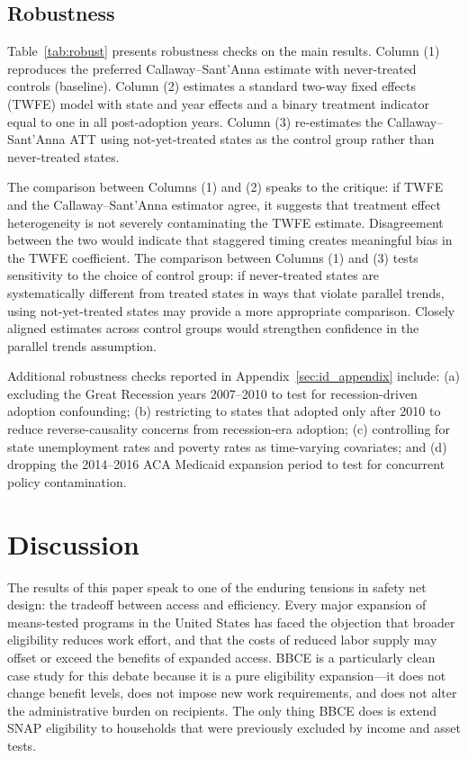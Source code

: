 \documentclass[12pt]{article}
\begin{document}
\subsection{Robustness}

Table~\ref{tab:robust} presents robustness checks on the main results. Column (1) reproduces the preferred Callaway--Sant'Anna estimate with never-treated controls (baseline). Column (2) estimates a standard two-way fixed effects (TWFE) model with state and year effects and a binary treatment indicator equal to one in all post-adoption years. Column (3) re-estimates the Callaway--Sant'Anna ATT using not-yet-treated states as the control group rather than never-treated states.



The comparison between Columns (1) and (2) speaks to the \citet{goodmanbacon2021difference} critique: if TWFE and the Callaway--Sant'Anna estimator agree, it suggests that treatment effect heterogeneity is not severely contaminating the TWFE estimate. Disagreement between the two would indicate that staggered timing creates meaningful bias in the TWFE coefficient. The comparison between Columns (1) and (3) tests sensitivity to the choice of control group: if never-treated states are systematically different from treated states in ways that violate parallel trends, using not-yet-treated states may provide a more appropriate comparison. Closely aligned estimates across control groups would strengthen confidence in the parallel trends assumption.

Additional robustness checks reported in Appendix~\ref{sec:id_appendix} include: (a) excluding the Great Recession years 2007--2010 to test for recession-driven adoption confounding; (b) restricting to states that adopted only after 2010 to reduce reverse-causality concerns from recession-era adoption; (c) controlling for state unemployment rates and poverty rates as time-varying covariates; and (d) dropping the 2014--2016 ACA Medicaid expansion period to test for concurrent policy contamination.

\section{Discussion}

The results of this paper speak to one of the enduring tensions in safety net design: the tradeoff between access and efficiency. Every major expansion of means-tested programs in the United States has faced the objection that broader eligibility reduces work effort, and that the costs of reduced labor supply may offset or exceed the benefits of expanded access. BBCE is a particularly clean case study for this debate because it is a pure eligibility expansion---it does not change benefit levels, does not impose new work requirements, and does not alter the administrative burden on recipients. The only thing BBCE does is extend SNAP eligibility to households that were previously excluded by income and asset tests.
\end{document}
